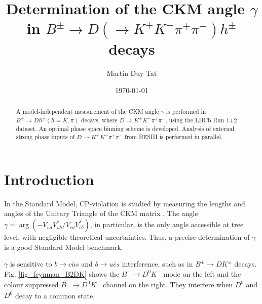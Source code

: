 \documentclass[12pt, a4paper, notitlepage, onecolumn]{article}
\title{Determination of the CKM angle $\gamma$ in $B^\pm\to D(\to K^+K^-\pi^+\pi^-)h^\pm$ decays}
\author{Martin Duy Tat}
\date{\today}
\begin{document}
\maketitle
\begin{abstract}
\noindent A model-independent measurement of the CKM angle $\gamma$ is performed in $B^\pm\to Dh^\pm (h = K, \pi)$ decays, where $D\to K^+K^-\pi^+\pi^-$, using the LHCb Run $1$+$2$ dataset. An optimal phase space binning scheme is developed. Analysis of external strong phase inputs of $D\to K^+K^-\pi^+\pi^-$ from BESIII is performed in parallel.
\end{abstract}
\section{Introduction}
\noindent In the Standard Model, CP-violation is studied by measuring the lengths and angles of the Unitary Triangle of the CKM matrix \cite{cite_CKM}. The angle $\gamma = \arg(-V_{ud}V^*_{ub}/V_{cd}V^*_{cb})$, in particular, is the only angle accessible at tree level, with negligible theoretical uncertainties. Thus, a precise determination of $\gamma$ is a good Standard Model benchmark.

$\gamma$ is sensitive to $b\to c\bar{u}s$ and $b\to u\bar{c}s$ interference, such as in $B^\pm\to DK^\pm$ decays. Fig. \ref{fig_feynman_B2DK} shows the $B^-\to D^0K^-$ mode on the left and the colour suppressed $B^-\to\bar{D^0}K^-$ channel on the right. They interfere when $D^0$ and $\bar{D^0}$ decay to a common state.
\end{document}

